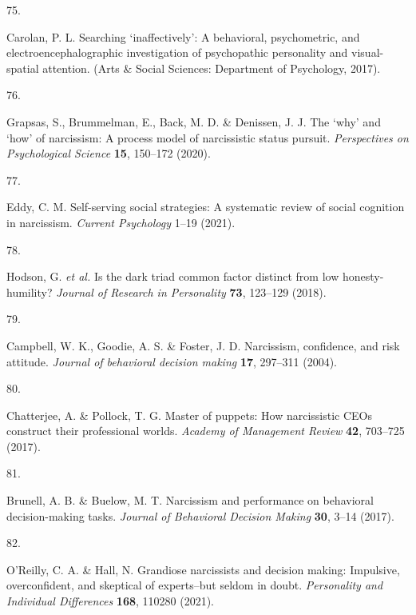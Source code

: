\documentclass[
  man,floatsintext]{apa6}
\newlength{\cslhangindent}
\newlength{\csllabelwidth}
\newlength{\cslentryspacingunit} %
\newenvironment{CSLReferences}[2] %
 {%
  \setlength{\parindent}{0pt}
  \ifodd #1
  \let\oldpar\par
  \def\par{\hangindent=\cslhangindent\oldpar}
  \fi
  \setlength{\parskip}{#2\cslentryspacingunit}
 }%
 {}
\newcommand{\CSLLeftMargin}[1]{\parbox[t]{\csllabelwidth}{#1}}
\newcommand{\CSLRightInline}[1]{\parbox[t]{\linewidth - \csllabelwidth}{#1}\break}
\begin{document}
\begin{CSLReferences}{0}{0}
\leavevmode{}%
\CSLLeftMargin{75. }%
\CSLRightInline{Carolan, P. L. Searching {`inaffectively'}: A behavioral, psychometric, and electroencephalographic investigation of psychopathic personality and visual-spatial attention. (Arts \& Social Sciences: Department of Psychology, 2017).}

\leavevmode{}%
\CSLLeftMargin{76. }%
\CSLRightInline{Grapsas, S., Brummelman, E., Back, M. D. \& Denissen, J. J. The {`why'} and {`how'} of narcissism: A process model of narcissistic status pursuit. \emph{Perspectives on Psychological Science} \textbf{15}, 150--172 (2020).}

\leavevmode{}%
\CSLLeftMargin{77. }%
\CSLRightInline{Eddy, C. M. Self-serving social strategies: A systematic review of social cognition in narcissism. \emph{Current Psychology} 1--19 (2021).}

\leavevmode{}%
\CSLLeftMargin{78. }%
\CSLRightInline{Hodson, G. \emph{et al.} Is the dark triad common factor distinct from low honesty-humility? \emph{Journal of Research in Personality} \textbf{73}, 123--129 (2018).}

\leavevmode{}%
\CSLLeftMargin{79. }%
\CSLRightInline{Campbell, W. K., Goodie, A. S. \& Foster, J. D. Narcissism, confidence, and risk attitude. \emph{Journal of behavioral decision making} \textbf{17}, 297--311 (2004).}

\leavevmode{}%
\CSLLeftMargin{80. }%
\CSLRightInline{Chatterjee, A. \& Pollock, T. G. Master of puppets: How narcissistic CEOs construct their professional worlds. \emph{Academy of Management Review} \textbf{42}, 703--725 (2017).}

\leavevmode{}%
\CSLLeftMargin{81. }%
\CSLRightInline{Brunell, A. B. \& Buelow, M. T. Narcissism and performance on behavioral decision-making tasks. \emph{Journal of Behavioral Decision Making} \textbf{30}, 3--14 (2017).}

\leavevmode{}%
\CSLLeftMargin{82. }%
\CSLRightInline{O'Reilly, C. A. \& Hall, N. Grandiose narcissists and decision making: Impulsive, overconfident, and skeptical of experts--but seldom in doubt. \emph{Personality and Individual Differences} \textbf{168}, 110280 (2021).}


\end{CSLReferences}
\end{document}
